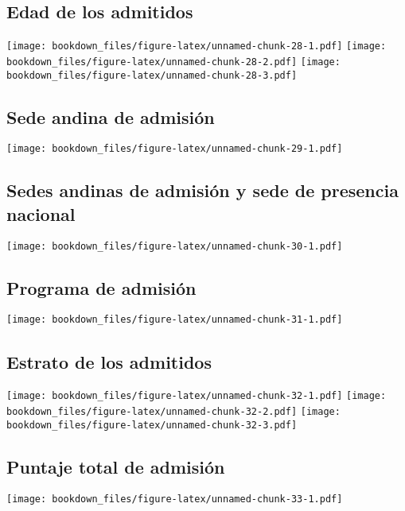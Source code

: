 \documentclass[]{article}
\theoremstyle{definition}
\theoremstyle{definition}
\theoremstyle{definition}
\theoremstyle{remark}
\begin{document}
\subsection{Edad de los admitidos}\label{edad-de-los-admitidos-1}

\texttt{[image: bookdown\_files/figure-latex/unnamed-chunk-28-1.pdf]}
\texttt{[image: bookdown\_files/figure-latex/unnamed-chunk-28-2.pdf]}
\texttt{[image: bookdown\_files/figure-latex/unnamed-chunk-28-3.pdf]}

\subsection{Sede andina de admisión}\label{sede-andina-de-admision}

\texttt{[image: bookdown\_files/figure-latex/unnamed-chunk-29-1.pdf]}

\subsection{Sedes andinas de admisión y sede de presencia
nacional}\label{sedes-andinas-de-admision-y-sede-de-presencia-nacional}

\texttt{[image: bookdown\_files/figure-latex/unnamed-chunk-30-1.pdf]}

\subsection{Programa de admisión}\label{programa-de-admision}

\texttt{[image: bookdown\_files/figure-latex/unnamed-chunk-31-1.pdf]}

\subsection{Estrato de los admitidos}\label{estrato-de-los-admitidos}

\texttt{[image: bookdown\_files/figure-latex/unnamed-chunk-32-1.pdf]}
\texttt{[image: bookdown\_files/figure-latex/unnamed-chunk-32-2.pdf]}
\texttt{[image: bookdown\_files/figure-latex/unnamed-chunk-32-3.pdf]}

\subsection{Puntaje total de admisión}\label{puntaje-total-de-admision}

\texttt{[image: bookdown\_files/figure-latex/unnamed-chunk-33-1.pdf]}
\end{document}
